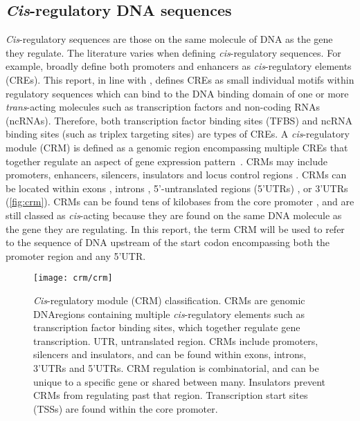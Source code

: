 \documentclass[../main.tex]{subfiles}
\begin{document}
\subsection{\texorpdfstring{\textit{Cis}-regulatory DNA sequences}{Cis\hyp{}regulatory DNA sequences}}\label{chapter1:cis-regulatory-dna-sequences}
\textit{Cis}\hyp{}regulatory sequences are those on the same molecule of DNA as the gene they regulate.
The literature varies when defining \textit{cis}\hyp{}regulatory sequences.
For example, \textcite*{wittkoppCisregulatoryElementsMolecular2012} broadly define both promoters and enhancers as \textit{cis}\hyp{}regulatory elements (CREs).
This report, in line with \textcite*{swinnenLessonsDomesticationTargeting2016}, defines CREs as small individual motifs within regulatory sequences which can bind to the DNA binding domain of one or more \textit{trans}\hyp{}acting molecules such as transcription factors and non\hyp{}coding RNAs (ncRNAs).
Therefore, both transcription factor binding sites (TFBS) and ncRNA binding sites (such as triplex targeting sites) are types of CREs.
A \textit{cis}\hyp{}regulatory module (CRM) is defined as a genomic region encompassing multiple CREs that together regulate an aspect of gene expression pattern~\autocite{guoNewAlgorithmIdentifying2017}.
CRMs may include promoters, enhancers, silencers, insulators and locus control regions \autocite{jeziorskaSystemsBiologyApproach2009}.
CRMs can be located within exons \autocite{tumpelRegulatoryModuleEmbedded2008}, introns \autocite{ostrovskyIdentificationStrongIntron2018}, 5’\hyp{}untranslated regions (5’UTRs) \autocite{bolleSegmentsEncodingUntranslated1994,henrySharedCisregulatoryModule2018}, or 3’UTRs \autocite{palmerEnhancerControlsSnail2007,yochumGenomewideScreenBetacatenin2008} (\autoref{fig:crm}).
CRMs can be found tens of kilobases from the core promoter \autocite{bien-willnerSOX9cre1CisactingRegulatory2007,okaGenomewideMappingTranscriptional2017}, and are still classed as \textit{cis}\hyp{}acting because they are found on the same DNA molecule as the gene they are regulating.
In this report, the term CRM will be used to refer to the sequence of DNA upstream of the start codon encompassing both the promoter region and any 5’UTR.

\begin{figure}[!hbt]
	\begin{center}
		\capstart{}
		\texttt{[image: crm/crm]}
		\caption{
			\textit{Cis}\hyp{}regulatory module (CRM) classification.
			CRMs are genomic DNAregions containing multiple \textit{cis}\hyp{}regulatory elements such as transcription factor binding sites, which together regulate gene transcription.
			UTR, untranslated region.
			CRMs include promoters, silencers and insulators, and can be found within exons, introns, 3'UTRs and 5'UTRs.
			CRM regulation is combinatorial, and can be unique to a specific gene or shared between many.
			Insulators prevent CRMs from regulating past that region.
			Transcription start sites (TSSs) are found within the core promoter.\label{fig:crm}
		}
	\end{center}
\end{figure}
\end{document}

